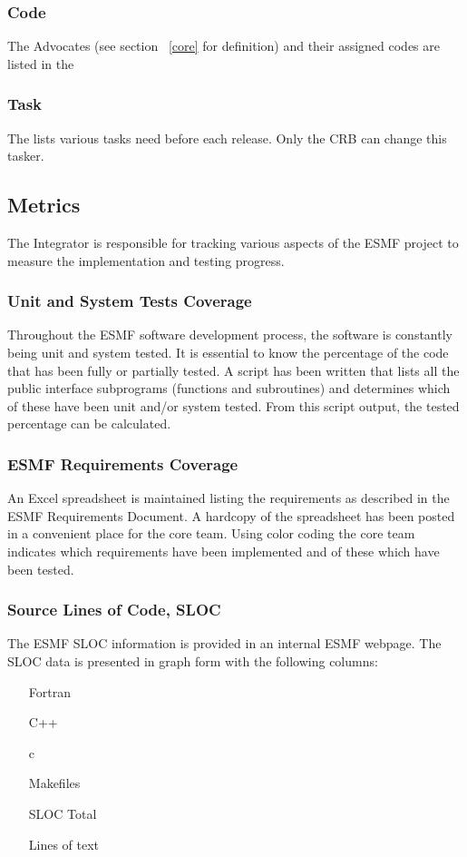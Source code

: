 \subsubsection{Code}
The Advocates (see section ~\ref{core} for definition) and their assigned codes are listed
in the 

\subsubsection{Task}
The  lists various tasks need before each release. Only the CRB can change this tasker. 

\subsection{Metrics}

The Integrator is responsible for tracking various aspects of the
ESMF project to measure the implementation and testing progress.
\subsubsection{Unit and System Tests Coverage}
Throughout the ESMF software development process, the software is constantly
being unit and system tested. It is essential to know the percentage of the
code that has been fully or partially tested. A script has been written that 
lists all the public interface subprograms (functions and subroutines) and 
determines which of these have been unit and/or system tested. From this script
output, the tested percentage can be calculated.
\subsubsection{ESMF Requirements Coverage}
An Excel spreadsheet is maintained listing the requirements as described in the
ESMF Requirements Document. A hardcopy of the spreadsheet has been posted in a
convenient place for the core team. Using color coding the core team indicates
which requirements have been implemented and of these which have been tested.
\subsubsection{Source Lines of Code, SLOC}
The ESMF SLOC information is provided in an internal ESMF webpage. The
SLOC data is presented in graph form with the following columns:
\begin{enumerate}
\item[Fortran] 
\item[C++] 
\item[c] 
\item[Makefiles] 
\item[SLOC Total] 
\item[Lines of text] 
\end{enumerate}

